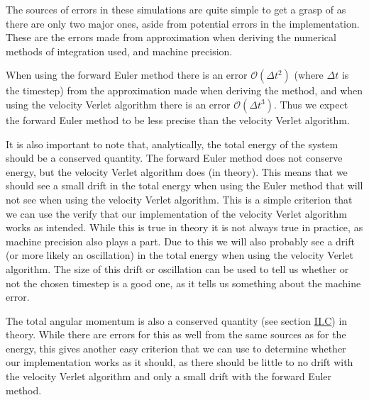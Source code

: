 \documentclass[reprint,english,notitlepage]{revtex4-1}  %
\begin{document}
The sources of errors in these simulations are quite simple to get a grasp of as there are only two major ones, aside from potential errors in the implementation. These are the errors made from approximation when deriving the numerical methods of integration used, and machine precision. 

When using the forward Euler method there is an error $\mathcal{O}(\Delta t^2)$ (where $\Delta t$ is the timestep) from the approximation made when deriving the method, and when using the velocity Verlet algorithm there is an error $\mathcal{O}(\Delta t^3)$. Thus we expect the forward Euler method to be less precise than the velocity Verlet algorithm. 

It is also important to note that, analytically, the total energy of the system should be a conserved quantity. The forward Euler method does not conserve energy, but the velocity Verlet algorithm does (in theory). This means that we should see a small drift in the total energy when using the Euler method that will not see when using the velocity Verlet algorithm. This is a simple criterion that we can use the verify that our implementation of the velocity Verlet algorithm works as intended. While this is true in theory it is not always true in practice, as machine precision also plays a part. Due to this we will also probably see a drift (or more likely an oscillation) in the total energy when using the velocity Verlet algorithm. The size of this drift or oscillation can be used to tell us whether or not the chosen timestep is a good one, as it tells us something about the machine error. 

The total angular momentum is also a conserved quantity (see section \hyperref[sec:II:c]{II.C}) in theory. While there are errors for this as well from the same sources as for the energy, this gives another easy criterion that we can use to determine whether our implementation works as it should, as there should be little to no drift with the velocity Verlet algorithm and only a small drift with the forward Euler method.  
\end{document}

